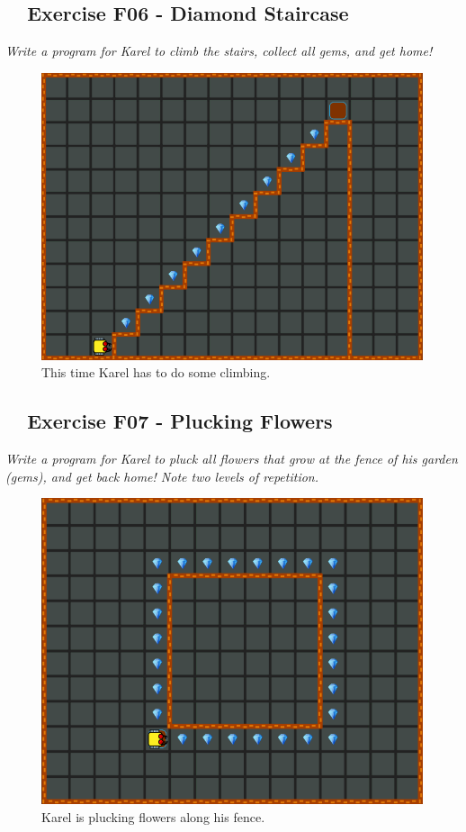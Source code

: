 \documentclass[article,A4,12pt]{llncs}
\begin{document}
{{{{\subsection{\ \ Exercise F06 - Diamond Staircase}

{\em Write a program for Karel to climb the stairs, collect all gems, and get home!}


\begin{figure}[!ht]
\begin{center}
\includegraphics[height=0.4\textwidth]{img/f06.png}
\end{center}
\vspace{-4mm}
\caption{This time Karel has to do some climbing.}
\label{fig:f06}
\vspace{-10mm}
\end{figure}
\noindent
\newpage


\subsection{\ \ Exercise F07 - Plucking Flowers}

{\em Write a program for Karel to pluck all flowers that grow at the fence of his garden (gems), and get back home! Note two levels of repetition.}\\[-7mm]


\begin{figure}[!ht]
\begin{center}
\includegraphics[height=0.4\textwidth]{img/f07.png}
\end{center}
\vspace{-4mm}
\caption{Karel is plucking flowers along his fence.}
\label{fig:f07}
\vspace{-4mm}
\end{figure}
\noindent

}}}}
\end{document}
